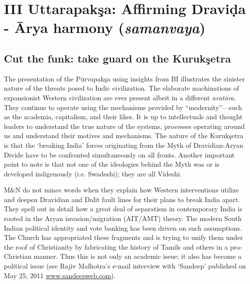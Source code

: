 \section*{III Uttarapakşa: Affirming Draviḍa - Ārya harmony (\textit{samanvaya})}

\subsection*{Cut the funk: take guard on the Kurukşetra}

The presentation of the Pūrvapakşa using insights from BI illustrates the sinister nature of the threats posed to Indic civilization. The elaborate machinations of expansionist Western civilization are ever present albeit in a different \textit{avatāra}. They continue to operate using the mechanisms provided by “modernity”—such as the academia, capitalism, and their likes. It is up to intellectuals and thought leaders to understand the true nature of the systems, processes operating around us and understand their motives and mechanisms. The nature of the Kurukşetra is that the ‘breaking India’ forces originating from the Myth of Dravidian-Aryan Divide have to be confronted simultaneously on all fronts. Another important point to note is that not one of the ideologies behind the Myth was or is developed indigenously (i.e. Swadeshi); they are all Videshi.

M\&N do not mince words when they explain how Western interventions utilize and deepen Dravidian and Dalit fault lines for their plans to break India apart. They spell out in detail how a great deal of separatism in contemporary India is rooted in the Aryan invasion/migration (AIT/AMT) theory. The modern South Indian political identity and vote banking has been driven on such assumptions. The Church has appropriated these fragments and is trying to unify them under the roof of Christianity by fabricating the history of Tamils and others in a pro-Christian manner. Thus this is not only an academic issue; it also has become a political issue (see Rajiv Malhotra’s e-mail interview with ‘Sandeep’ published on May 25, 2011 \url{www.sandeepweb.com}).

